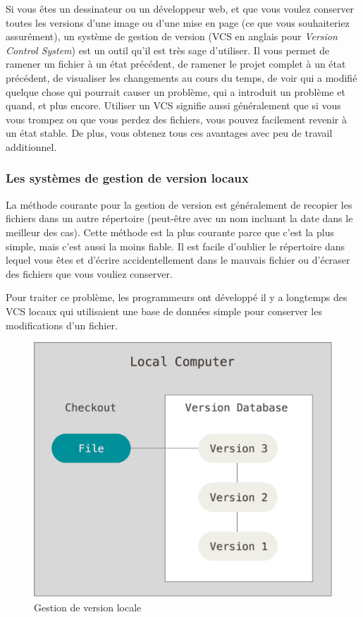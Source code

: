 Si vous êtes un dessinateur ou un développeur web, et que vous voulez conserver toutes les versions d'une image ou d'une mise en page (ce que vous souhaiteriez assurément), un système de gestion de version (VCS en anglais pour \emph{Version Control System}) est un outil qu'il est très sage d'utiliser.
Il vous permet de ramener un fichier à un état précédent, de ramener le projet complet à un état précédent, de visualiser les changements au cours du temps, de voir qui a modifié quelque chose qui pourrait causer un problème, qui a introduit un problème et quand, et plus encore.
Utiliser un VCS signifie aussi généralement que si vous vous trompez ou que vous perdez des fichiers, vous pouvez facilement revenir à un état stable.
De plus, vous obtenez tous ces avantages avec peu de travail additionnel.

\subsubsection{Les systèmes de gestion de version locaux}

La méthode courante pour la gestion de version est généralement de recopier les fichiers dans un autre répertoire (peut-être avec un nom incluant la date dans le meilleur des cas).
Cette méthode est la plus courante parce que c'est la plus simple, mais c'est aussi la moins fiable.
Il est facile d'oublier le répertoire dans lequel vous êtes et d'écrire accidentellement dans le mauvais fichier ou d'écraser des fichiers que vous vouliez conserver.

Pour traiter ce problème, les programmeurs ont développé il y a longtemps des VCS locaux qui utilisaient une base de données simple pour conserver les modifications d'un fichier.

\begin{figure}[!h]
  \centering
  \includegraphics{images/local}
  \caption{Gestion de version locale}
  \label{fig:git:local}
\end{figure}

